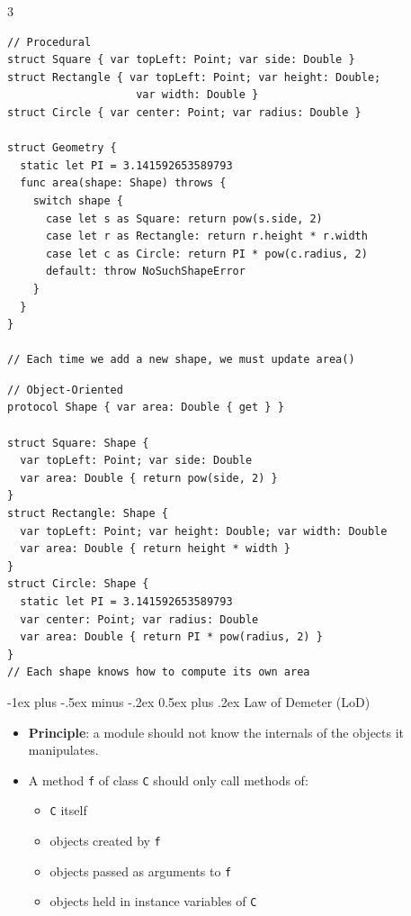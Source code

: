 \documentclass[a4paper, 9pt, landscape]{extarticle}
\makeatletter
\renewcommand{\subsection}{\@startsection{subsubsection}{3}{0mm}%
                                {-1ex plus -.5ex minus -.2ex}%
                                {0.5ex plus .2ex}%
                                {\normalfont\small\bfseries}}
\makeatother
\begin{document}
\begin{multicols*}{3}
\begin{verbatim}
// Procedural
struct Square { var topLeft: Point; var side: Double }
struct Rectangle { var topLeft: Point; var height: Double; 
                    var width: Double }
struct Circle { var center: Point; var radius: Double }

struct Geometry {
  static let PI = 3.141592653589793
  func area(shape: Shape) throws {
    switch shape {
      case let s as Square: return pow(s.side, 2)
      case let r as Rectangle: return r.height * r.width
      case let c as Circle: return PI * pow(c.radius, 2)
      default: throw NoSuchShapeError
    }
  }
}

// Each time we add a new shape, we must update area()

\end{verbatim}

\columnbreak

\begin{verbatim}
// Object-Oriented
protocol Shape { var area: Double { get } }

struct Square: Shape {
  var topLeft: Point; var side: Double
  var area: Double { return pow(side, 2) }
}
struct Rectangle: Shape {
  var topLeft: Point; var height: Double; var width: Double
  var area: Double { return height * width }
}
struct Circle: Shape {
  static let PI = 3.141592653589793
  var center: Point; var radius: Double
  var area: Double { return PI * pow(radius, 2) }
}
// Each shape knows how to compute its own area
\end{verbatim}

\subsection{Law of Demeter (LoD)}
\begin{itemize}
  \item \textbf{Principle}: a module should not know the internals of the objects it manipulates.
  \item A method \texttt{f} of class \texttt{C} should only call methods of:
  \begin{itemize}
    \item \texttt{C} itself
    \item objects created by \texttt{f}
    \item objects passed as arguments to \texttt{f}
    \item objects held in instance variables of \texttt{C}
  \end{itemize}
\end{itemize}


\end{multicols*}
\end{document}
